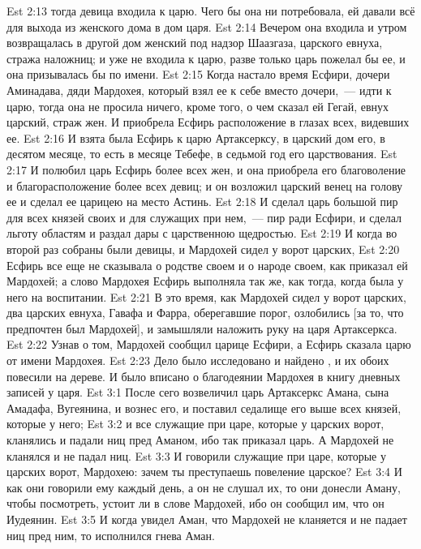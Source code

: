 \vs Est 2:13 тогда девица входила к царю. Чего бы она ни потребовала, ей давали всё для выхода из женского дома в дом царя.
\vs Est 2:14 Вечером она входила и утром возвращалась в другой дом женский под надзор Шаазгаза, царского евнуха, стража наложниц; и уже не входила к царю, разве только царь пожелал бы ее, и она призывалась бы по имени.
\rsbpar\vs Est 2:15 Когда настало время Есфири, дочери Аминадава, дяди Мардохея, который взял ее к себе вместо дочери,~--- идти к царю, тогда она не просила ничего, кроме того, о чем сказал ей Гегай, евнух царский, страж жен. И приобрела Есфирь расположение  в глазах всех, видевших ее.
\vs Est 2:16 И взята была Есфирь к царю Артаксерксу, в царский дом его, в десятом месяце, то есть в месяце Тебефе, в седьмой год его царствования.
\vs Est 2:17 И полюбил царь Есфирь более всех жен, и она приобрела его благоволение и благорасположение более всех девиц; и он возложил царский венец на голову ее и сделал ее царицею на место Астинь.
\vs Est 2:18 И сделал царь большой пир для всех князей своих и для служащих при нем,~--- пир ради Есфири, и сделал льготу областям и раздал дары с царственною щедростью.
\vs Est 2:19 И когда во второй раз собраны были девицы, и Мардохей сидел у ворот царских,
\vs Est 2:20 Есфирь все еще не сказывала о родстве своем и о народе своем, как приказал ей Мардохей; а слово Мардохея Есфирь выполняла  так же, как тогда, когда была у него на воспитании.
\vs Est 2:21 В это время, как Мардохей сидел у ворот царских, два царских евнуха, Гавафа и Фарра, оберегавшие порог, озлобились [за то, что предпочтен был Мардохей], и замышляли наложить руку на царя Артаксеркса.
\vs Est 2:22 Узнав о том, Мардохей сообщил царице Есфири, а Есфирь сказала царю от имени Мардохея.
\vs Est 2:23 Дело было исследовано и найдено , и их обоих повесили на дереве. И было вписано о благодеянии Мардохея в книгу дневных записей у царя.
\vs Est 3:1 После сего возвеличил царь Артаксеркс Амана, сына Амадафа, Вугеянина, и вознес его, и поставил седалище его выше всех князей, которые у него;
\vs Est 3:2 и все служащие при царе, которые  у царских ворот, кланялись и падали ниц пред Аманом, ибо так приказал царь. А Мардохей не кланялся и не падал ниц.
\vs Est 3:3 И говорили служащие при царе, которые у царских ворот, Мардохею: зачем ты преступаешь повеление царское?
\vs Est 3:4 И как они говорили ему каждый день, а он не слушал их, то они донесли Аману, чтобы посмотреть, устоит ли в слове  Мардохей, ибо он сообщил им, что он Иудеянин.
\rsbpar\vs Est 3:5 И когда увидел Аман, что Мардохей не кланяется и не падает ниц пред ним, то исполнился гнева Аман.
